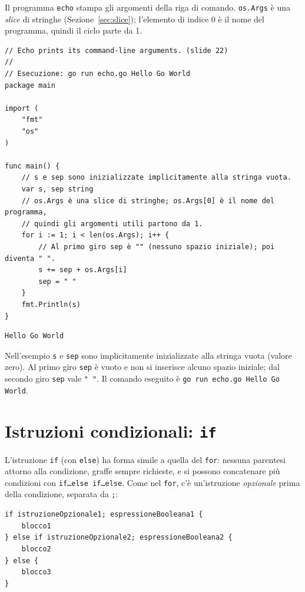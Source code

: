 \documentclass[11pt,a4paper]{report}
\newcommand{\cod}[1]{\texttt{#1}}
\begin{document}
Il programma \cod{echo} stampa gli argomenti della riga di comando.
\cod{os.Args} è una \emph{slice} di stringhe (Sezione~\ref{sec:slice}); l'elemento
di indice 0 è il nome del programma, quindi il ciclo parte da 1.

\begin{lstlisting}[style=gocode,caption={\texttt{03\_control\_flow/echo.go}}]
// Echo prints its command-line arguments. (slide 22)
//
// Esecuzione: go run echo.go Hello Go World
package main

import (
	"fmt"
	"os"
)

func main() {
	// s e sep sono inizializzate implicitamente alla stringa vuota.
	var s, sep string
	// os.Args è una slice di stringhe; os.Args[0] è il nome del programma,
	// quindi gli argomenti utili partono da 1.
	for i := 1; i < len(os.Args); i++ {
		// Al primo giro sep è "" (nessuno spazio iniziale); poi diventa " ".
		s += sep + os.Args[i]
		sep = " "
	}
	fmt.Println(s)
}
\end{lstlisting}
\begin{lstlisting}[style=output]
Hello Go World
\end{lstlisting}

Nell'esempio \cod{s} e \cod{sep} sono implicitamente inizializzate alla stringa
vuota (valore zero). Al primo giro \cod{sep} è vuoto e non si inserisce
alcuno spazio iniziale; dal secondo giro \cod{sep} vale \cod{" "}. Il comando
eseguito è \cod{go run echo.go Hello Go World}.

\section{Istruzioni condizionali: \texttt{if}}\label{sec:if}

L'istruzione \cod{if} (con \cod{else}) ha forma simile a quella del \cod{for}:
nessuna parentesi attorno alla condizione, graffe sempre richieste, e si possono
concatenare più condizioni con \cod{if\ldots else if\ldots else}. Come nel
\cod{for}, c'è un'istruzione \emph{opzionale} prima della condizione, separata
da \cod{;}:

\begin{lstlisting}[style=gocode,numbers=none,caption={Forma generale}]
if istruzioneOpzionale1; espressioneBooleana1 {
	blocco1
} else if istruzioneOpzionale2; espressioneBooleana2 {
	blocco2
} else {
	blocco3
}
\end{lstlisting}
\end{document}
